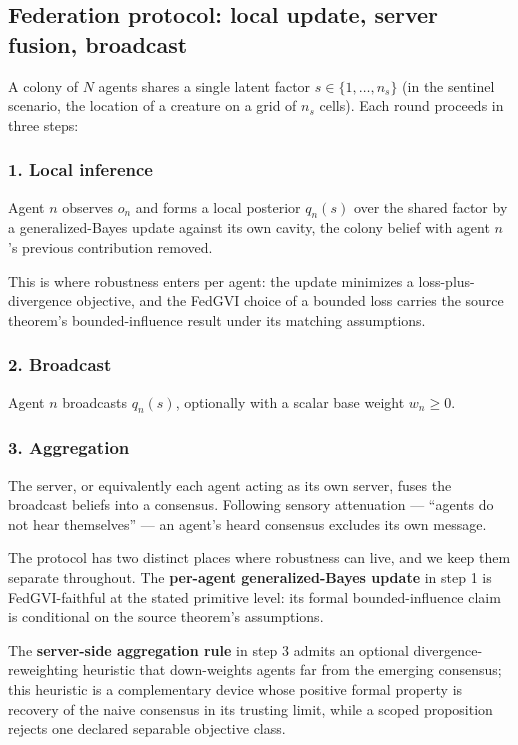 \documentclass[
  english,
]{article}
\theoremstyle{plain}
\theoremstyle{definition}
\theoremstyle{remark}
\theoremstyle{definition}
\begin{document}
\subsection{Federation protocol: local update, server fusion,
broadcast}\label{sec:method-protocol}

A colony of \(N\) agents shares a single latent factor
\(s \in \{1,\dots,n_s\}\) (in the sentinel scenario, the location of a
creature on a grid of \(n_s\) cells). Each round proceeds in three
steps:

\subsubsection{1. Local inference}\label{local-inference}

Agent \(n\) observes \(o_n\) and forms a local posterior \(q_n(s)\) over
the shared factor by a generalized-Bayes update against its own cavity,
the colony belief with agent \(n\)'s previous contribution removed.

This is where robustness enters per agent: the update minimizes a
loss-plus-divergence objective, and the FedGVI choice of a bounded loss
carries the source theorem's bounded-influence result under its matching
assumptions.

\subsubsection{2. Broadcast}\label{broadcast}

Agent \(n\) broadcasts \(q_n(s)\), optionally with a scalar base weight
\(w_n \ge 0\).

\subsubsection{3. Aggregation}\label{aggregation}

The server, or equivalently each agent acting as its own server, fuses
the broadcast beliefs into a consensus. Following sensory attenuation
--- ``agents do not hear themselves'' --- an agent's heard consensus
excludes its own message.

The protocol has two distinct places where robustness can live, and we
keep them separate throughout. The \textbf{per-agent generalized-Bayes
update} in step 1 is FedGVI-faithful at the stated primitive level: its
formal bounded-influence claim is conditional on the source theorem's
assumptions.

The \textbf{server-side aggregation rule} in step 3 admits an optional
divergence-reweighting heuristic that down-weights agents far from the
emerging consensus; this heuristic is a complementary device whose
positive formal property is recovery of the naive consensus in its
trusting limit, while a scoped proposition rejects one declared
separable objective class.
\end{document}
